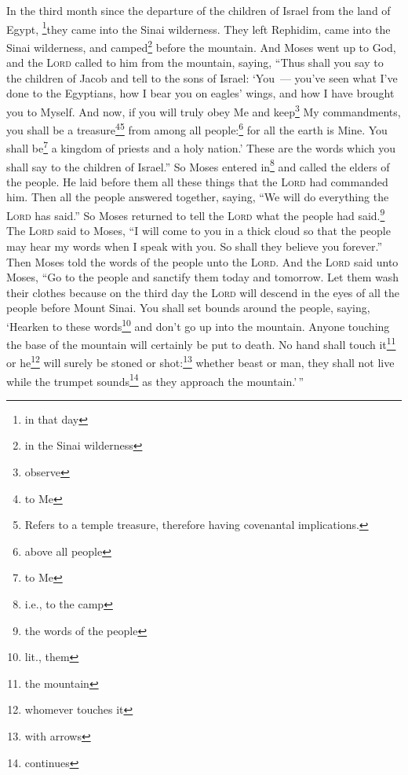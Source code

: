 
\begin{enumerate*}[mode=unboxed]
     In the third month since the departure of the children of Israel from the land of Egypt, \footnote{in that day}they came into the Sinai wilderness.%
     They left Rephidim, came into the Sinai wilderness, and camped\footnote{in the Sinai wilderness} before the mountain.%
     And Moses went up to God, and the \textsc{Lord} called to him from the mountain, saying, ``Thus shall you say to the children of Jacob and tell to the sons of Israel:%
     `You~--- you've seen what I've done to the Egyptians, how I bear you on eagles' wings, and how I have brought you to Myself.%
     And now, if you will truly obey Me and keep\footnote{observe} My commandments, you shall be a treasure\footnote{to Me}\footnote{Refers to a temple treasure, therefore having covenantal implications.} from among all people:\footnote{above all people} for all the earth is Mine.%
     You shall be\footnote{to Me} a kingdom of priests and a holy nation.' These are the words which you shall say to the children of Israel.''%
     So Moses entered in\footnote{i.e., to the camp} and called the elders of the people. He laid before them all these things that the \textsc{Lord} had commanded him.%
     Then all the people answered together, saying, ``We will do everything the \textsc{Lord} has said.'' So Moses returned to tell the \textsc{Lord} what the people had said.\footnote{the words of the people}%
     The \textsc{Lord} said to Moses, ``I will come to you in a thick cloud so that the people may hear my words when I speak with you. So shall they believe you forever.'' Then Moses told the words of the people unto the \textsc{Lord}.%
     And the \textsc{Lord} said unto Moses, ``Go to the people and sanctify them today and tomorrow. Let them wash their clothes%
     because on the third day the \textsc{Lord} will descend in the eyes of all the people before Mount Sinai.%
     You shall set bounds around the people, saying, `Hearken to these words\footnote{lit., them} and don't go up into the mountain. Anyone touching the base of the mountain will certainly be put to death.%
     No hand shall touch it\footnote{the mountain} or he\footnote{whomever touches it} will surely be stoned or shot:\footnote{with arrows} whether beast or man, they shall not live while the trumpet sounds\footnote{continues} as they approach the mountain.'\,''%

\end{enumerate*}
